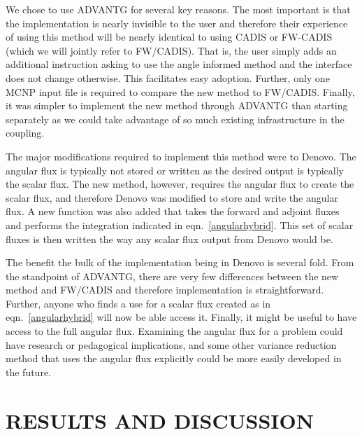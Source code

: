 \documentclass[12pt]{article}
\begin{document}
We chose to use ADVANTG for several key reasons. 
The most important is that the implementation is nearly invisible to the user and therefore their experience of using this method will be nearly identical to using CADIS or FW-CADIS (which we will jointly refer to FW/CADIS).
That is, the user simply adds an additional instruction asking to use the angle informed method and the interface does not change otherwise.
This facilitates easy adoption.
Further, only one MCNP input file is required to compare the new method to FW/CADIS.
Finally, it was simpler to implement the new method through ADVANTG than starting separately as we could take advantage of so much existing infrastructure in the coupling.

The major modifications required to implement this method were to Denovo. 
The angular flux is typically not stored or written as the desired output is typically the scalar flux.
The new method, however, requires the angular flux to create the scalar flux, and therefore Denovo was modified to store and write the angular flux.
A new function was also added that takes the forward and adjoint fluxes and performs the integration indicated in eqn.~\eqref{angularhybrid}. 
This set of scalar fluxes is then written the way any scalar flux output from Denovo would be.

The benefit the bulk of the implementation being in Denovo is several fold. 
From the standpoint of ADVANTG, there are very few differences between the new method and FW/CADIS and therefore implementation is straightforward.
Further, anyone who finds a use for a scalar flux created as in eqn.~\eqref{angularhybrid} will now be able  access it.
Finally, it might be useful to have access to the full angular flux. 
Examining the angular flux for a problem could have research or pedagogical implications, and some other variance reduction method that uses the angular flux explicitly could be more easily developed in the future.

%
\section{RESULTS AND DISCUSSION} 
\label{sect::results}
\end{document}
